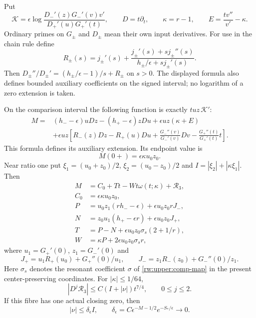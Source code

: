 Put
\[
 \mathcal K=\epsilon\log
 \frac{D_-'(z)G_-'(v)v'}{D_+'(u)G_+'(t)},\qquad
 D=t\partial_t,\qquad \kappa=r-1,\qquad
 E=\frac{tv''}{v'}-\kappa.
\]
Ordinary primes on $G_\pm$ and $D_\pm$ mean their own input
derivatives. For use in the chain rule define
\[
 R_\pm(s)=j_\pm'(s)+
       \frac{j_\pm'(s)+sj_\pm''(s)}{h_\pm/\epsilon+sj_\pm'(s)}.
\]
Then $D_\pm''/D_\pm'=(h_\pm/\epsilon-1)/s+R_\pm$ on $s>0$.
The displayed formula also defines bounded auxiliary coefficients on
the signed interval; no logarithm of a zero extension is taken.

\begin{proposition}
\label{rw:finite:three-numerator}
On the comparison interval the following function is exactly
$tuz\,\mathcal K'$:
\begin{equation}\label{rw:finite:three-M}
\begin{aligned}
 M={}&(h_--\epsilon)uDz-(h_+-\epsilon)zDu
              +\epsilon uz(\kappa+E)\\
 &+\epsilon uz\left[
 R_-(z)Dz-R_+(u)Du+
 \frac{G_-''(v)}{G_-'(v)}Dv-
 \frac{G_+''(t)}{G_+'(t)}t\right].
\end{aligned}
\end{equation}
This formula defines its auxiliary extension. Its endpoint value is
\[
 M(0+)=\epsilon\kappa u_0z_0.
\]
Near ratio one put
$\xi_1=(u_0+z_0)/2$, $\xi_2=(u_0-z_0)/2$ and
$I=|\xi_2|+|\kappa\xi_1|$. Then
\begin{equation}\label{rw:finite:three-comp}
\begin{aligned}
 M&=C_0+Tt-Wt\omega(t;\kappa)+\mathcal R_3,\\
 C_0&=\epsilon\kappa u_0z_0,\\
 P&=u_0z_1(rh_--\epsilon)+\epsilon u_0z_0rJ_-,\\
 N&=z_0u_1(h_+-\epsilon r)+\epsilon u_0z_0J_+,\\
 T&=P-N+\epsilon u_0z_0\sigma_s(2+1/r),\\
 W&=\kappa P+2\epsilon u_0z_0\sigma_s r,
\end{aligned}
\end{equation}
where $u_1=G_+'(0)$, $z_1=G_-'(0)$ and
\[
 J_+=u_1R_+(u_0)+G_+''(0)/u_1,\qquad
 J_-=z_1R_-(z_0)+G_-''(0)/z_1.
\]
Here $\sigma_s$ denotes the resonant coefficient $\sigma$ of
\eqref{rw:upper:comp-map} in the present center-preserving coordinates.
For $|\kappa|\le1/64$,
\begin{equation}\label{rw:finite:three-remainder}
 |D^j\mathcal R_3|\le C(I+|\nu|)t^{7/4},\qquad 0\le j\le2.
\end{equation}
If this fibre has one actual closing zero, then
\begin{equation}\label{rw:finite:three-forcing}
 |\nu|\le\delta_\epsilon I,\qquad
 \delta_\epsilon=C\epsilon^{-M-1/2}e^{-S_*/\epsilon}\longrightarrow0.
\end{equation}
\end{proposition}

